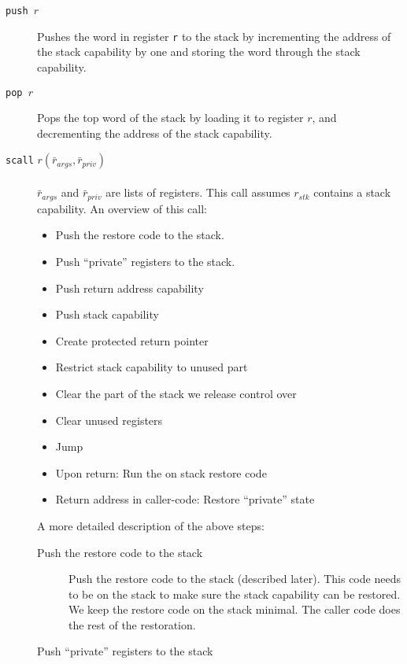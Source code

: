 \documentclass[a4paper]{article}
\newcommand{\forcenewline}{$\phantom{v}$\\}
\newcommand{\var}[1]{\mathit{#1}}
\begin{document}
              \begin{description}
              \item[\texttt{push $r$}] Pushes the word in register \texttt{r} to the stack by incrementing the address of the stack capability by one and storing the word through the stack capability.
              \item[\texttt{pop $r$}] Pops the top word of the stack by loading it to register $r$, and decrementing the address of the stack capability.
              \item[\texttt{scall} $r(\bar{r}_{\var{args}},\bar{r}_{\var{priv}})$] \forcenewline$\bar{r}_{\var{args}}$ and $\bar{r}_{\var{priv}}$ are lists of registers. This call assumes $r_{\var{stk}}$ contains a stack capability. An overview of this call:
                \begin{itemize}
                \item Push the restore code to the stack.
                \item Push ``private'' registers to the stack.
                \item Push return address capability 
                \item Push stack capability
                \item Create protected return pointer
                \item Restrict stack capability to unused part 
                \item Clear the part of the stack we release control over
                \item Clear unused registers
                \item Jump
                \item Upon return: Run the on stack restore code
                \item Return address in caller-code:  Restore ``private'' state
                \end{itemize}
                A more detailed description of the above steps:
                \begin{description}
                \item [Push the restore code to the stack]
                  Push the restore code to the stack (described later). This code needs to be on the stack to make sure the stack capability can be restored. We keep the restore code on the stack minimal. The caller code does the rest of the restoration.
                \item [Push ``private'' registers to the stack]

\end{description}
\end{description}
\end{document}
